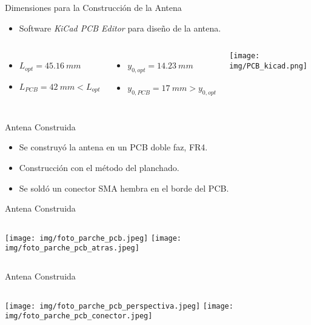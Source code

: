 \begin{frame}{Dimensiones para la Construcción de la Antena}
    \begin{itemize}
        \item<1-> Software \textit{KiCad PCB Editor} para diseño de la antena.
    \end{itemize}
\begin{columns}
        \begin{itemize}
            \item<3-> $L_{opt} = 45.16 \ mm$
            \item<3-> $L_{PCB} = 42 \ mm < L_{opt}$
        \end{itemize}
        \vspace{1cm}
        \begin{itemize}
            \item<4-> $y_{0,opt} = 14.23 \ mm$
            \item<4-> $y_{0,PCB} = 17 \ mm > y_{0,opt}$
        \end{itemize}
        \texttt{[image: img/PCB\_kicad.png]}
\end{columns}
\end{frame}

\begin{frame}{Antena Construida}

\begin{itemize}
    \item<1-> Se construyó la antena en un PCB doble faz, FR4.
    \item<2-> Construcción con el método del planchado.
    \item<3-> Se soldó un conector SMA hembra en el borde del PCB.
\end{itemize}
\end{frame}

\begin{frame}{Antena Construida}
\begin{columns}
        \texttt{[image: img/foto\_parche\_pcb.jpeg]}
        \texttt{[image: img/foto\_parche\_pcb\_atras.jpeg]}
\end{columns}
\end{frame}

\begin{frame}{Antena Construida}
\begin{columns}
        \texttt{[image: img/foto\_parche\_pcb\_perspectiva.jpeg]}
        \texttt{[image: img/foto\_parche\_pcb\_conector.jpeg]}
\end{columns}
\end{frame}